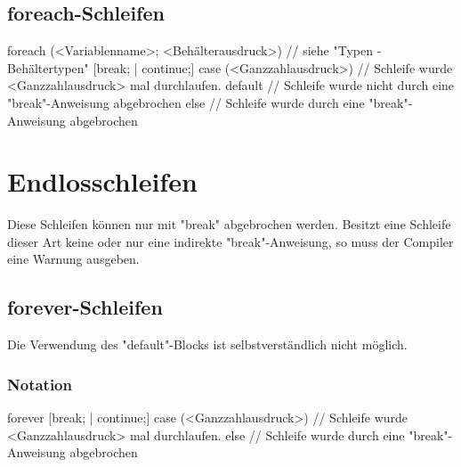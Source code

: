 \subsection{foreach-Schleifen}
foreach (<Variablenname>; <Behälterausdruck>) // siehe "Typen - Behältertypen"
{
	[break; | continue;]
}
case (<Ganzzahlausdruck>) // Schleife wurde <Ganzzahlausdruck> mal durchlaufen.
{
}
default // Schleife wurde nicht durch eine "break"-Anweisung abgebrochen
{
}
else // Schleife wurde durch eine "break"-Anweisung abgebrochen
{
}

\section{Endlosschleifen}
Diese Schleifen können nur mit "break" abgebrochen werden. Besitzt eine Schleife dieser Art keine oder nur eine indirekte
"break"-Anweisung, so muss der Compiler eine Warnung ausgeben.

\subsection{forever-Schleifen}
Die Verwendung des "default"-Blocks ist selbstverständlich nicht möglich.

\subsubsection{Notation}
forever
{
	[break; | continue;]
}
case (<Ganzzahlausdruck>) // Schleife wurde <Ganzzahlausdruck> mal durchlaufen.
{
}
else // Schleife wurde durch eine "break"-Anweisung abgebrochen
{
}